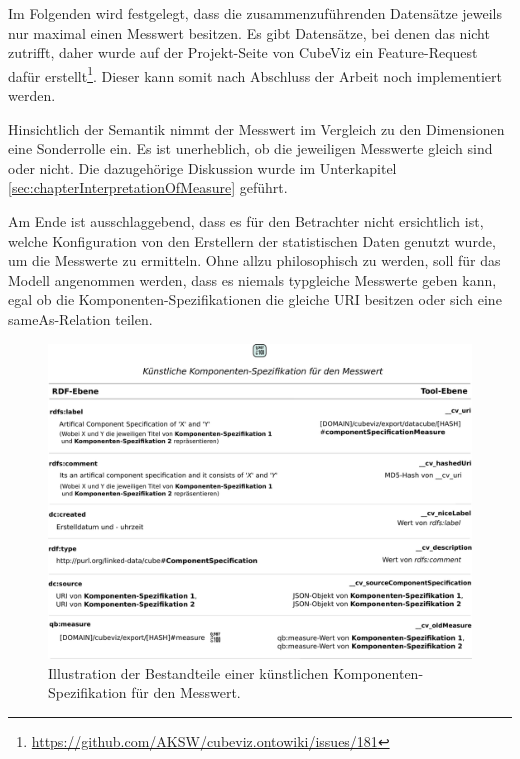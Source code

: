 \documentclass[11pt]{article}
\newcommand{\com}[1]{\marginpar{\em {\small{#1}}}} %
\begin{document}
Im Folgenden wird festgelegt, dass die zusammenzuführenden Datensätze jeweils nur maximal einen Messwert besitzen. Es gibt Datensätze, bei denen das nicht zutrifft, daher wurde auf der Projekt-Seite von CubeViz ein Feature-Request dafür erstellt\footnote{\url{https://github.com/AKSW/cubeviz.ontowiki/issues/181}}. Dieser kann somit nach Abschluss der Arbeit noch implementiert werden.

Hinsichtlich der Semantik nimmt der Messwert im Vergleich zu den Dimensionen eine Sonderrolle ein. Es ist unerheblich, ob die jeweiligen Messwerte gleich sind oder nicht. Die dazugehörige Diskussion wurde im Unterkapitel \ref{sec:chapterInterpretationOfMeasure}\com{Kapitel \ref{sec:chapterInterpretationOfMeasure} \\ S. \pageref{sec:chapterInterpretationOfMeasure}} geführt.

Am Ende ist ausschlaggebend, dass es für den Betrachter nicht ersichtlich ist, welche Konfiguration von den Erstellern der statistischen Daten genutzt wurde, um die Messwerte zu ermitteln. Ohne allzu philosophisch zu werden, soll für das Modell angenommen werden, dass es niemals typgleiche Messwerte geben kann, egal ob die Komponenten-Spezifikationen die gleiche URI besitzen oder sich eine sameAs-Relation teilen.

%
%
\begin{figure}[h!]
    \centering
    \includegraphics[width=15cm]{MergedDataCube/ComponentSpecificationMeasure.pdf}
    \caption{Illustration der Bestandteile einer künstlichen Komponenten-Spezifikation für den Messwert.}
    \label{fig:MergedDataCube_ComponentSpecificationMeasure}
\end{figure}
\end{document}

